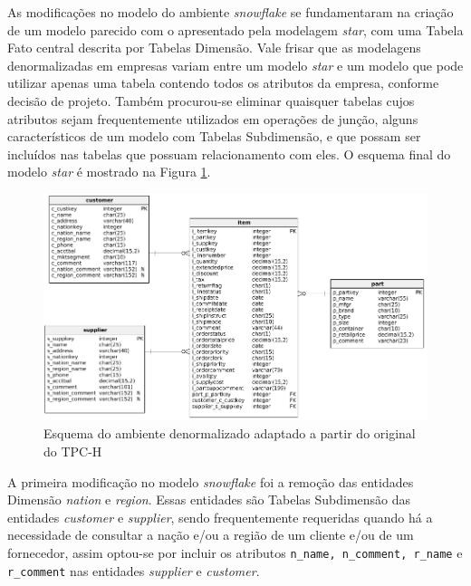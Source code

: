 As modificações no modelo do ambiente \textit{snowflake} se fundamentaram na criação de um modelo parecido com o apresentado pela modelagem \textit{star}, com uma Tabela Fato central descrita por Tabelas Dimensão. Vale frisar que as modelagens denormalizadas em empresas variam entre um modelo \textit{star} e um modelo que pode utilizar apenas uma tabela contendo todos os atributos da empresa, conforme decisão de projeto.
Também procurou-se eliminar quaisquer tabelas cujos atributos sejam frequentemente utilizados em operações de junção, alguns característicos de um modelo com Tabelas Subdimensão, e que possam ser incluídos nas tabelas que possuam relacionamento com eles. O esquema final do modelo \textit{star} é mostrado na Figura \ref{fig:star}.

\begin{figure}[h]
	\centering
		\includegraphics[width=\textwidth]{img/star.png}
	\caption{Esquema do ambiente denormalizado adaptado a partir do original do TPC-H}
	\label{fig:star}
\end{figure}
 
A primeira modificação no modelo \textit{snowflake} foi a remoção das entidades Dimensão \textit{nation} e \textit{region}. Essas entidades são Tabelas Subdimensão das entidades \textit{customer} e \textit{supplier}, sendo frequentemente requeridas quando há a necessidade de consultar a nação e/ou a região de um cliente e/ou de um fornecedor, assim optou-se por incluir os atributos \texttt{n\_name, n\_comment, r\_name} e \texttt{r\_comment} nas entidades \textit{supplier} e \textit{customer}. 

